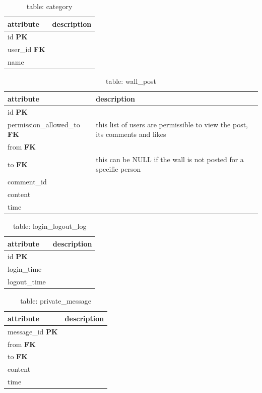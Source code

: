 \begin{table}[h]
    \centering
    \begin{tabular}{ll}
    attribute            & description\\ \hline
    id \textbf{PK}       & \\
    user\_id \textbf{FK} & \\
    name                 & \\
    \end{tabular}
    \caption{table: category}
\end{table}

\begin{table}[h]
    \centering
    \begin{tabular}{ll}
    attribute                           & description\\ \hline
    id \textbf{PK}                      & \\
    permission\_allowed\_to \textbf{FK} & this list of users are permissible to view the post, its comments and likes\\
    from \textbf{FK}                    & \\
    to \textbf{FK}                      & this can be NULL if the wall is not posted for a specific person\\
    comment\_id                         & \\
    content                             & \\
    time                                & \\
    \end{tabular}
    \caption{table: wall\_post}
\end{table}

\begin{table}[h]
    \centering
    \begin{tabular}{ll}
    attribute      & description\\ \hline
    id \textbf{PK} & \\
    login\_time    & \\
    logout\_time   & \\
    \end{tabular}
    \caption{table: login\_logout\_log}
\end{table}

\begin{table}[h]
    \centering
    \begin{tabular}{ll}
    attribute               & description\\ \hline
    message\_id \textbf{PK} & \\
    from \textbf{FK}        & \\
    to \textbf{FK}          & \\
    content                 & \\
    time                    & \\
    \end{tabular}
    \caption{table: private\_message}
\end{table}

